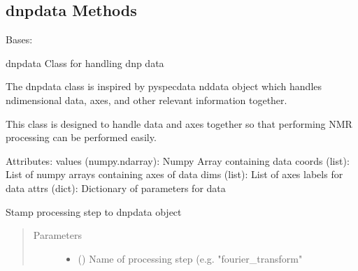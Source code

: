 \documentclass[letterpaper,10pt,english]{sphinxmanual}
\begin{document}
\subsection{dnpdata Methods}
\label{\detokenize{dnpData:dnpdata-methods}}

\begin{fulllineitems}
\label{\detokenize{dnpData:dnpLab.dnpdata}}
Bases: 

dnpdata Class for handling dnp data

The dnpdata class is inspired by pyspecdata nddata object which handles n\sphinxhyphen{}dimensional data, axes, and other relevant information together.

This class is designed to handle data and axes together so that performing NMR processing can be performed easily.

Attributes:
values (numpy.ndarray): Numpy Array containing data
coords (list): List of numpy arrays containing axes of data
dims (list): List of axes labels for data
attrs (dict): Dictionary of parameters for data

\begin{fulllineitems}
\label{\detokenize{dnpData:dnpLab.dnpdata.add_proc_attrs}}
Stamp processing step to dnpdata object
\begin{quote}\begin{description}
\item[{Parameters}] \leavevmode\begin{itemize}
\item {} 
 () \sphinxhyphen{}\sphinxhyphen{} Name of processing step (e.g. "fourier\_transform"


\end{itemize}
\end{description}
\end{quote}
\end{fulllineitems}
\end{fulllineitems}
\end{document}
